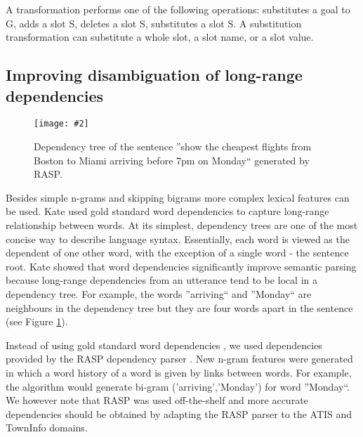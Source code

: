 \documentclass{article}
\newcommand{\citep}[1]{\cite{#1}}
\newcommand{\fgrparam}[4]{
  \begin{figure}[htbp]
    \begin{center}
      \leavevmode
      \texttt{[image: \#2]}
    \end{center}
    \vspace{-0.5cm}
    \caption{#4}
    \label{#3}
  \end{figure}
}
\begin{document}
A transformation performs one of the following operations: substitutes a goal to G, adds a slot S, deletes a slot S, substitutes a slot S. A substitution transformation can substitute a whole slot, a slot name, 
or a slot value.

\subsection{Improving disambiguation of long-range dependencies}
\label{sec:dep:trees}

\fgrparam{width=6cm}{./fig/dep-tree.pdf}{fig:dep:tree}{Dependency tree of the sentence ''show the cheapest flights from Boston to Miami arriving before 7pm on Monday`` generated by RASP.}

Besides simple n-grams and skipping bigrams more complex lexical features can be used. Kate \citep{kate08} used gold standard word dependencies to capture long-range relationship between words. At its simplest, dependency trees are one of the most concise way to describe language syntax. Essentially, each word is viewed as the dependent of one other word, with the exception of a single word - the sentence root. Kate showed that word dependencies significantly improve semantic parsing because long-range dependencies from an utterance tend to be local in a dependency tree. For example, the words ''arriving`` and ''Monday`` are neighbours in the dependency tree but they are four words apart in the sentence (see Figure \ref{fig:dep:tree}).

Instead of using gold standard word dependencies \cite{kate08}, we used dependencies provided by the RASP dependency parser \cite{rasp06}. 
New n-gram features were generated in which a word history of a word is given by links between words. For example, the algorithm would generate bi-gram ('arriving','Monday') for word ''Monday``.
We however note that RASP was used off-the-shelf and more accurate dependencies should be obtained by adapting the RASP parser to the ATIS and TownInfo domains.
\end{document}
